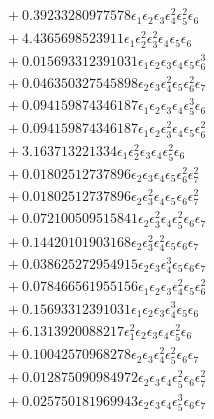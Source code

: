 \documentclass[10pt]{article}
\begin{document}
\begin{align*}
&{}  + 0.39233280977578 \epsilon_{1} \epsilon_{2} \epsilon_{3} \epsilon_{4}^{2} \epsilon_{5}^{2} \epsilon_{6} \\
&{}  + 4.4365698523911 \epsilon_{1} \epsilon_{2}^{2} \epsilon_{3}^{2} \epsilon_{4} \epsilon_{5} \epsilon_{6} \\
&{}  + 0.015693312391031 \epsilon_{1} \epsilon_{2} \epsilon_{3} \epsilon_{4} \epsilon_{5} \epsilon_{6}^{3} \\
&{}  + 0.046350327545898 \epsilon_{2} \epsilon_{3} \epsilon_{4}^{2} \epsilon_{5} \epsilon_{6}^{2} \epsilon_{7} \\
&{}  + 0.094159874346187 \epsilon_{1} \epsilon_{2} \epsilon_{3} \epsilon_{4} \epsilon_{5}^{3} \epsilon_{6} \\
&{}  + 0.094159874346187 \epsilon_{1} \epsilon_{2} \epsilon_{3}^{2} \epsilon_{4} \epsilon_{5} \epsilon_{6}^{2} \\
&{}  + 3.163713221334 \epsilon_{1} \epsilon_{2}^{2} \epsilon_{3} \epsilon_{4} \epsilon_{5}^{2} \epsilon_{6} \\
&{}  + 0.01802512737896 \epsilon_{2} \epsilon_{3} \epsilon_{4} \epsilon_{5} \epsilon_{6}^{2} \epsilon_{7}^{2} \\
&{}  + 0.01802512737896 \epsilon_{2} \epsilon_{3}^{2} \epsilon_{4} \epsilon_{5} \epsilon_{6} \epsilon_{7}^{2} \\
&{}  + 0.072100509515841 \epsilon_{2} \epsilon_{3}^{2} \epsilon_{4} \epsilon_{5}^{2} \epsilon_{6} \epsilon_{7} \\
&{}  + 0.14420101903168 \epsilon_{2} \epsilon_{3}^{2} \epsilon_{4}^{2} \epsilon_{5} \epsilon_{6} \epsilon_{7} \\
&{}  + 0.038625272954915 \epsilon_{2} \epsilon_{3} \epsilon_{4}^{3} \epsilon_{5} \epsilon_{6} \epsilon_{7} \\
&{}  + 0.078466561955156 \epsilon_{1} \epsilon_{2} \epsilon_{3} \epsilon_{4}^{2} \epsilon_{5} \epsilon_{6}^{2} \\
&{}  + 0.15693312391031 \epsilon_{1} \epsilon_{2} \epsilon_{3} \epsilon_{4}^{3} \epsilon_{5} \epsilon_{6} \\
&{}  + 6.1313920088217 \epsilon_{1}^{2} \epsilon_{2} \epsilon_{3} \epsilon_{4} \epsilon_{5}^{2} \epsilon_{6} \\
&{}  + 0.10042570968278 \epsilon_{2} \epsilon_{3} \epsilon_{4}^{2} \epsilon_{5}^{2} \epsilon_{6} \epsilon_{7} \\
&{}  + 0.012875090984972 \epsilon_{2} \epsilon_{3} \epsilon_{4} \epsilon_{5}^{2} \epsilon_{6} \epsilon_{7}^{2} \\
&{}  + 0.025750181969943 \epsilon_{2} \epsilon_{3} \epsilon_{4} \epsilon_{5}^{3} \epsilon_{6} \epsilon_{7} \\

\end{align*}
\end{document}
